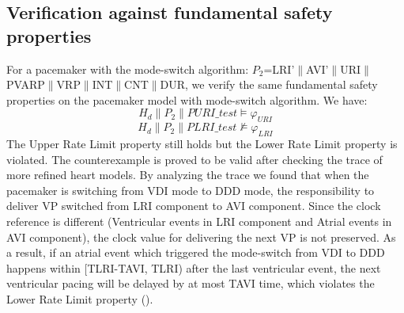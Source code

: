 \subsection{Verification against fundamental safety properties}
For a pacemaker with the mode-switch algorithm: $P_2$=\textsf{LRI'$\|$AVI'$\|$URI$\|$PVARP$\|$VRP$\|$INT$\|$CNT$\|$DUR}, we verify the same fundamental safety properties on the pacemaker model with mode-switch algorithm. We have:
$$H_d\|P_2\|PURI\_test\models\varphi_{URI}$$
$$H_d\|P_2\|PLRI\_test\not\models\varphi_{LRI}$$
The Upper Rate Limit property still holds but the Lower Rate Limit property is violated. The counterexample is proved to be valid after checking the trace of more refined heart models. By analyzing the trace we found that when the pacemaker is switching from VDI mode to DDD mode, the responsibility to deliver VP switched from LRI component to AVI component. Since the clock reference is different (Ventricular events in LRI component and Atrial events in AVI component), the clock value for delivering the next VP is not preserved. As a result, if an atrial event which triggered the mode-switch from VDI to DDD happens within [TLRI-TAVI, TLRI) after the last ventricular event, the next ventricular pacing will be delayed by at most TAVI time, which violates the Lower Rate Limit property (). 
